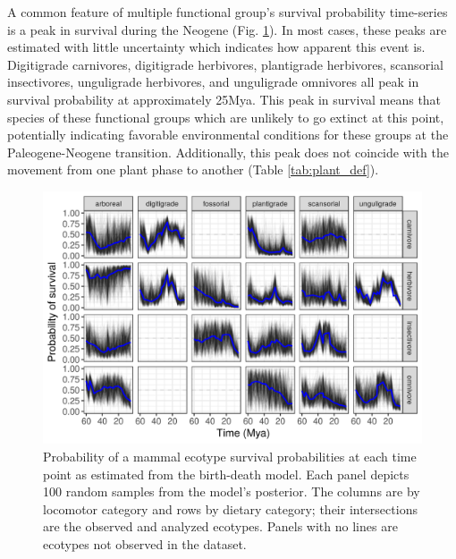 \documentclass[12pt,letterpaper]{article}
\begin{document}
A common feature of multiple functional group's survival probability time-series is a peak in survival during the Neogene (Fig. \ref{fig:eco_survival}). In most cases, these peaks are estimated with little uncertainty which indicates how apparent this event is. Digitigrade carnivores, digitigrade herbivores, plantigrade herbivores, scansorial insectivores, unguligrade herbivores, and unguligrade omnivores all peak in survival probability at approximately 25Mya. This peak in survival means that species of these functional groups which are unlikely to go extinct at this point, potentially indicating favorable environmental conditions for these groups at the Paleogene-Neogene transition. Additionally, this peak does not coincide with the movement from one plant phase to another (Table \ref{tab:plant_def}). 
\begin{figure}[ht]
  \centering
  \includegraphics[width=\textwidth,height=0.4\textheight,keepaspectratio=true]{figure/ecotype_survival_bd}
  \caption[Ecotype survival probability estimated from the birth-death model]{Probability of a mammal ecotype survival probabilities at each time point as estimated from the birth-death model. Each panel depicts 100 random samples from the model's posterior. The columns are by locomotor category and rows by dietary category; their intersections are the observed and analyzed ecotypes. Panels with no lines are ecotypes not observed in the dataset.}
  \label{fig:eco_survival}
\end{figure}
\end{document}
